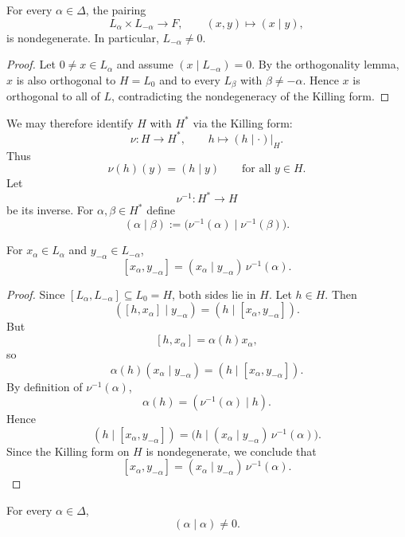 \begin{corollary}
    For every $\alpha\in\Delta$, the pairing
    \[
        L_\alpha\times L_{-\alpha}\to F,
        \qquad (x,y)\mapsto (x\mid y),
    \]
    is nondegenerate. In particular, $L_{-\alpha}\neq 0$.
\end{corollary}

\begin{proof}
    Let $0\neq x\in L_\alpha$ and assume $(x\mid L_{-\alpha})=0$. By the orthogonality
    lemma, $x$ is also orthogonal to $H=L_0$ and to every $L_\beta$ with
    $\beta\neq -\alpha$. Hence $x$ is orthogonal to all of $L$, contradicting the
    nondegeneracy of the Killing form.
\end{proof}

We may therefore identify $H$ with $H^*$ via the Killing form:
\[
    \nu\colon H\longrightarrow H^*,
    \qquad
    h\longmapsto (h\mid \cdot)\vert_H .
\]
Thus
\[
    \nu(h)(y)=(h\mid y)
    \qquad \text{for all } y\in H.
\]
Let
\[
    \nu^{-1}\colon H^*\longrightarrow H
\]
be its inverse. For $\alpha,\beta\in H^*$ define
\[
    (\alpha\mid\beta):=\bigl(\nu^{-1}(\alpha)\mid \nu^{-1}(\beta)\bigr).
\]

\begin{lemma}
    For $x_\alpha\in L_\alpha$ and $y_{-\alpha}\in L_{-\alpha}$,
    \[
        [x_\alpha,y_{-\alpha}]
        =
        (x_\alpha\mid y_{-\alpha})\,\nu^{-1}(\alpha).
    \]
\end{lemma}

\begin{proof}
    Since $[L_\alpha,L_{-\alpha}]\subseteq L_0=H$, both sides lie in $H$.
    Let $h\in H$. Then
    \[
        ([h,x_\alpha]\mid y_{-\alpha})
        =
        (h\mid [x_\alpha,y_{-\alpha}]).
    \]
    But
    \[
        [h,x_\alpha]=\alpha(h)x_\alpha,
    \]
    so
    \[
        \alpha(h)(x_\alpha\mid y_{-\alpha})
        =
        (h\mid [x_\alpha,y_{-\alpha}]).
    \]
    By definition of $\nu^{-1}(\alpha)$,
    \[
        \alpha(h)
        =
        (\nu^{-1}(\alpha)\mid h).
    \]
    Hence
    \[
        (h\mid [x_\alpha,y_{-\alpha}])
        =
        \bigl(h\mid (x_\alpha\mid y_{-\alpha})\,\nu^{-1}(\alpha)\bigr).
    \]
    Since the Killing form on $H$ is nondegenerate, we conclude that
    \[
        [x_\alpha,y_{-\alpha}]
        =
        (x_\alpha\mid y_{-\alpha})\,\nu^{-1}(\alpha).
    \]
\end{proof}

\begin{lemma}
    For every $\alpha\in\Delta$,
    \[
        (\alpha\mid\alpha)\neq 0.
    \]
\end{lemma}


